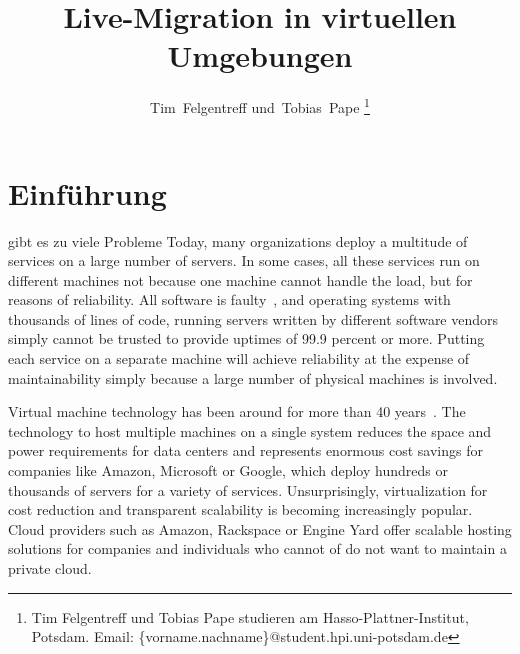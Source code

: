 \documentclass[journal]{IEEEtran}
\makeatletter
\def\markboth#1#2{\def\leftmark{\@IEEEcompsoconly{\sffamily}\MakeUppercase{\protect#1}}%
\def\rightmark{\@IEEEcompsoconly{\sffamily}\MakeUppercase{\protect#2}}}
\makeatother
\begin{document}
\title{Live-Migration in virtuellen Umgebungen}
\author{Tim~Felgentreff und~Tobias~Pape%
\thanks{%
  Tim Felgentreff und Tobias Pape studieren am
  Hasso-Plattner-Institut, Potsdam.\goodbreak
  Email: \{vorname.nachname\}@student.hpi.uni-potsdam.de}%
}
\markboth{Industrieseminar Cloud-Computing}{Felgentreff, Pape: Live-Migration}

\maketitle

\begin{abstract}
  
\end{abstract}

\IEEEpeerreviewmaketitle


\section{Einführung}
\label{sec:einfuehrung}
 gibt es zu viele Probleme
Today, many organizations deploy a multitude of services on a large
number of servers. In some cases, all these services run on different
machines not because one machine cannot handle the load, but for
reasons of reliability.  All software is faulty~\cite{zellerprograms},
and operating systems with thousands of lines of code, running servers
written by different software vendors simply cannot be trusted to
provide uptimes of 99.9 percent or more. Putting each service on a
separate machine will achieve reliability at the expense of
maintainability simply because a large number of physical machines is
involved.

Virtual machine technology has been around for more than 40
years~\cite{tanenbaum1992modern}. The technology to host multiple
machines on a single system reduces the space and power requirements
for data centers and represents enormous cost savings for companies
like Amazon, Microsoft or Google, which deploy hundreds or thousands
of servers for a variety of services. Unsurprisingly, virtualization
for cost reduction and transparent scalability is becoming
increasingly popular. Cloud providers such as Amazon, Rackspace or
Engine Yard offer scalable hosting solutions for companies and
individuals who cannot of do not want to maintain a private cloud.
\end{document}
